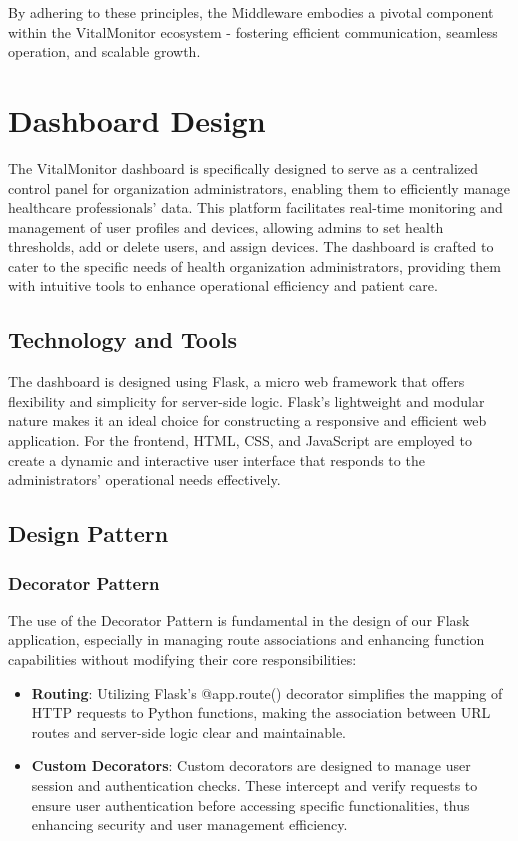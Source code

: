 By adhering to these principles, the Middleware embodies a pivotal component within the VitalMonitor ecosystem - fostering efficient communication, seamless operation, and scalable growth.

\section{Dashboard Design}

The VitalMonitor dashboard is specifically designed to serve as a centralized control panel for organization administrators, enabling them to efficiently manage healthcare professionals' data. This platform facilitates real-time monitoring and management of user profiles and devices, allowing admins to set health thresholds, add or delete users, and assign devices. The dashboard is crafted to cater to the specific needs of health organization administrators, providing them with intuitive tools to enhance operational efficiency and patient care.

\subsection{Technology and Tools}
The dashboard is designed using Flask, a micro web framework that offers flexibility and simplicity for server-side logic. Flask's lightweight and modular nature makes it an ideal choice for constructing a responsive and efficient web application. For the frontend, HTML, CSS, and JavaScript are employed to create a dynamic and interactive user interface that responds to the administrators' operational needs effectively.

\subsection{Design Pattern}


\subsubsection{Decorator Pattern}
The use of the Decorator Pattern is fundamental in the design of our Flask application, especially in managing route associations and enhancing function capabilities without modifying their core responsibilities:

\begin{itemize}
    \item \textbf{Routing}: Utilizing Flask's @app.route() decorator simplifies the mapping of HTTP requests to Python functions, making the association between URL routes and server-side logic clear and maintainable.
    \item \textbf{Custom Decorators}:  Custom decorators are designed to manage user session and authentication checks. These intercept and verify requests to ensure user authentication before accessing specific functionalities, thus enhancing security and user management efficiency.
\end{itemize}

